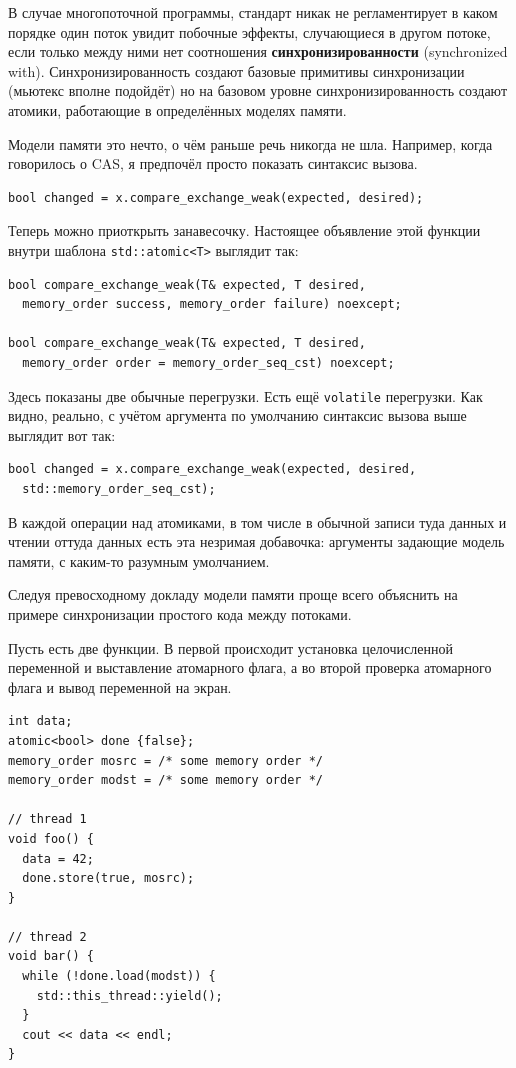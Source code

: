 \documentclass[a4paper,12pt,oneside]{book}
\begin{document}
В случае многопоточной программы, стандарт никак не регламентирует в каком порядке один поток увидит побочные эффекты, случающиеся в другом потоке, если только между ними нет соотношения \textbf{синхронизированности} (synchronized with). Синхронизированность создают базовые примитивы синхронизации (мьютекс вполне подойдёт) но на базовом уровне синхронизированность создают атомики, работающие в определённых моделях памяти.

Модели памяти это нечто, о чём раньше речь никогда не шла. Например, когда говорилось о CAS, я предпочёл просто показать синтаксис вызова. 

\begin{lstlisting}
bool changed = x.compare_exchange_weak(expected, desired);
\end{lstlisting}

Теперь можно приоткрыть занавесочку. Настоящее объявление этой функции внутри шаблона \lstinline!std::atomic<T>! выглядит так:

\begin{lstlisting}
bool compare_exchange_weak(T& expected, T desired,
  memory_order success, memory_order failure) noexcept;

bool compare_exchange_weak(T& expected, T desired,
  memory_order order = memory_order_seq_cst) noexcept;
\end{lstlisting}

Здесь показаны две обычные перегрузки. Есть ещё \lstinline!volatile! перегрузки. Как видно, реально, с учётом аргумента по умолчанию синтаксис вызова выше выглядит вот так:

\begin{lstlisting}
bool changed = x.compare_exchange_weak(expected, desired,
  std::memory_order_seq_cst);
\end{lstlisting}

В каждой операции над атомиками, в том числе в обычной записи туда данных и чтении оттуда данных есть эта незримая добавочка: аргументы задающие модель памяти, с каким-то разумным умолчанием.

Следуя превосходному докладу \cite{talk:birbacher} модели памяти проще всего объяснить на примере синхронизации простого кода между потоками.

Пусть есть две функции. В первой происходит установка целочисленной переменной и выставление атомарного флага, а во второй проверка атомарного флага и вывод переменной на экран.  

\begin{lstlisting}
int data;
atomic<bool> done {false};
memory_order mosrc = /* some memory order */
memory_order modst = /* some memory order */

// thread 1
void foo() {
  data = 42;
  done.store(true, mosrc);
}

// thread 2
void bar() {
  while (!done.load(modst)) {
    std::this_thread::yield();
  }
  cout << data << endl;  
}
\end{lstlisting}
\end{document}
